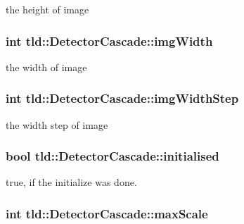 the height of image 

\hypertarget{classtld_1_1DetectorCascade_a593db7c6ab225f17ac02cd9ef5faebd2}{
\subsubsection[{img\-Width}]{\setlength{\rightskip}{0pt plus 5cm}int tld\-::\-Detector\-Cascade\-::img\-Width}}\label{classtld_1_1DetectorCascade_a593db7c6ab225f17ac02cd9ef5faebd2}


the width of image 

\hypertarget{classtld_1_1DetectorCascade_aa47c6463f1ae23868551a4c82c555f24}{
\subsubsection[{img\-Width\-Step}]{\setlength{\rightskip}{0pt plus 5cm}int tld\-::\-Detector\-Cascade\-::img\-Width\-Step}}\label{classtld_1_1DetectorCascade_aa47c6463f1ae23868551a4c82c555f24}


the width step of image 

\hypertarget{classtld_1_1DetectorCascade_a4a61cd265a92bce6f8f148db532a1789}{
\subsubsection[{initialised}]{\setlength{\rightskip}{0pt plus 5cm}bool tld\-::\-Detector\-Cascade\-::initialised}}\label{classtld_1_1DetectorCascade_a4a61cd265a92bce6f8f148db532a1789}


true, if the initialize was done. 

\hypertarget{classtld_1_1DetectorCascade_aac2cd4b31c290d1eeba69591cbb65ce4}{
\subsubsection[{max\-Scale}]{\setlength{\rightskip}{0pt plus 5cm}int tld\-::\-Detector\-Cascade\-::max\-Scale}}\label{classtld_1_1DetectorCascade_aac2cd4b31c290d1eeba69591cbb65ce4}


